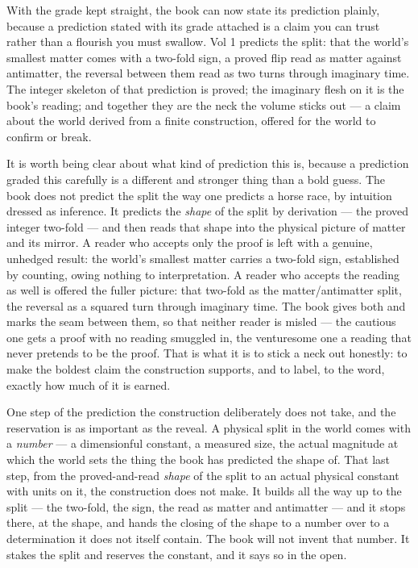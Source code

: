 With the grade kept straight, the book can now state its prediction plainly, because a prediction stated with its
grade attached is a claim you can trust rather than a flourish you must swallow. Vol 1 predicts the split: that the
world's smallest matter comes with a two-fold sign, a proved flip read as matter against antimatter, the reversal
between them read as two turns through imaginary time. The integer skeleton of that prediction is proved; the
imaginary flesh on it is the book's reading; and together they are the neck the volume sticks out --- a claim
about the world derived from a finite construction, offered for the world to confirm or break.

It is worth being clear about what kind of prediction this is, because a prediction graded this carefully is a
different and stronger thing than a bold guess. The book does not predict the split the way one predicts a horse
race, by intuition dressed as inference. It predicts the \emph{shape} of the split by derivation --- the proved
integer two-fold --- and then reads that shape into the physical picture of matter and its mirror. A reader who
accepts only the proof is left with a genuine, unhedged result: the world's smallest matter carries a two-fold
sign, established by counting, owing nothing to interpretation. A reader who accepts the reading as well is offered
the fuller picture: that two-fold as the matter/antimatter split, the reversal as a squared turn through imaginary
time. The book gives both and marks the seam between them, so that neither reader is misled --- the cautious one
gets a proof with no reading smuggled in, the venturesome one a reading that never pretends to be the proof. That
is what it is to stick a neck out honestly: to make the boldest claim the construction supports, and to label, to
the word, exactly how much of it is earned.

One step of the prediction the construction deliberately does not take, and the reservation is as important as the
reveal. A physical split in the world comes with a \emph{number} --- a dimensionful constant, a measured size, the
actual magnitude at which the world sets the thing the book has predicted the shape of. That last step, from the
proved-and-read \emph{shape} of the split to an actual physical constant with units on it, the construction does
not make. It builds all the way up to the split --- the two-fold, the sign, the read as matter and antimatter ---
and it stops there, at the shape, and hands the closing of the shape to a number over to a determination it does
not itself contain. The book will not invent that number. It stakes the split and reserves the constant, and it
says so in the open.

